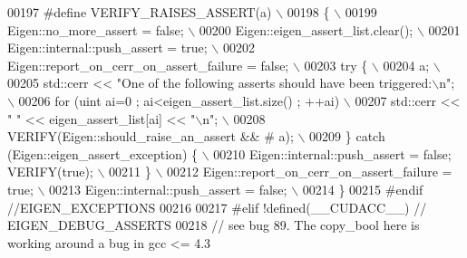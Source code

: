 \begin{DoxyCode}
00197 \textcolor{preprocessor}{    #define VERIFY\_RAISES\_ASSERT(a)                                                   \(\backslash\)}
00198 \textcolor{preprocessor}{      \{                                                                               \(\backslash\)}
00199 \textcolor{preprocessor}{        Eigen::no\_more\_assert = false;                                                \(\backslash\)}
00200 \textcolor{preprocessor}{        Eigen::eigen\_assert\_list.clear();                                             \(\backslash\)}
00201 \textcolor{preprocessor}{        Eigen::internal::push\_assert = true;                                          \(\backslash\)}
00202 \textcolor{preprocessor}{        Eigen::report\_on\_cerr\_on\_assert\_failure = false;                              \(\backslash\)}
00203 \textcolor{preprocessor}{        try \{                                                                         \(\backslash\)}
00204 \textcolor{preprocessor}{          a;                                                                          \(\backslash\)}
00205 \textcolor{preprocessor}{          std::cerr << "One of the following asserts should have been triggered:\(\backslash\)n";  \(\backslash\)}
00206 \textcolor{preprocessor}{          for (uint ai=0 ; ai<eigen\_assert\_list.size() ; ++ai)                        \(\backslash\)}
00207 \textcolor{preprocessor}{            std::cerr << "  " << eigen\_assert\_list[ai] << "\(\backslash\)n";                       \(\backslash\)}
00208 \textcolor{preprocessor}{          VERIFY(Eigen::should\_raise\_an\_assert && # a);                               \(\backslash\)}
00209 \textcolor{preprocessor}{        \} catch (Eigen::eigen\_assert\_exception) \{                                     \(\backslash\)}
00210 \textcolor{preprocessor}{          Eigen::internal::push\_assert = false; VERIFY(true);                         \(\backslash\)}
00211 \textcolor{preprocessor}{        \}                                                                             \(\backslash\)}
00212 \textcolor{preprocessor}{        Eigen::report\_on\_cerr\_on\_assert\_failure = true;                               \(\backslash\)}
00213 \textcolor{preprocessor}{        Eigen::internal::push\_assert = false;                                         \(\backslash\)}
00214 \textcolor{preprocessor}{      \}}
00215 \textcolor{preprocessor}{    #endif //EIGEN\_EXCEPTIONS}
00216 
00217 \textcolor{preprocessor}{  #elif !defined(\_\_CUDACC\_\_) // EIGEN\_DEBUG\_ASSERTS}
00218     \textcolor{comment}{// see bug 89. The copy\_bool here is working around a bug in gcc <= 4.3}

\end{DoxyCode}
